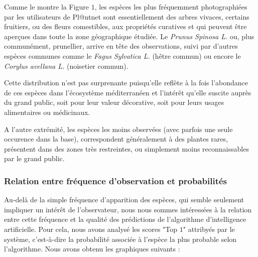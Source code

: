 \documentclass[a4paper,12pt]{article}
\begin{document}

Comme le montre la Figure $1$, les espèces les plus fréquemment photographiées par les utilisateurs de Pl@ntnet sont essentiellement des arbres vivaces, certains fruitiers, ou des fleurs comestibles, aux propriétés curatives et qui peuvent être aperçues dans toute la zone géographique étudiée. Le \textit{Prunus Spinosa L.} ou, plus communément, prunellier, arrive en tête des observations, suivi par d'autres espèces communes comme le \textit{Fagus Sylvatica L.} (hêtre commun) ou encore le \textit{Corylus avellana L.} (noisetier commun).

\vspace{0.2cm}

Cette distribution n'est pas surprenante puisqu'elle reflète à la fois l'abondance de ces espèces dans l'écosystème méditerranéen et l'intérêt qu'elle suscite auprès du grand public, soit pour leur valeur décorative, soit pour leurs usages alimentaires ou médicinaux.

\vspace{0.2cm}

A l'autre extrémité, les espèces les moins observées (avec parfois une seule occurence dans la base), correspondent généralement à des plantes rares, présentent dans des zones très restreintes, ou simplement moins reconnaissables par le grand public.

\subsubsection{Relation entre fréquence d'observation et probabilités}

Au-delà de la simple fréquence d'apparition des espèces, qui semble seulement impliquer un intérêt de l'observateur, nous nous sommes intéressées à la relation entre cette fréquence et la qualité des prédictions de l'algorithme d'intelligence artificielle. Pour cela, nous avons analysé les scores "Top $1$" attribyés par le système, c'est-à-dire la probabilité associée à l'espèce la plus probable selon l'algorithme. Nous avons obtenu les graphiques suivants :
\end{document}

